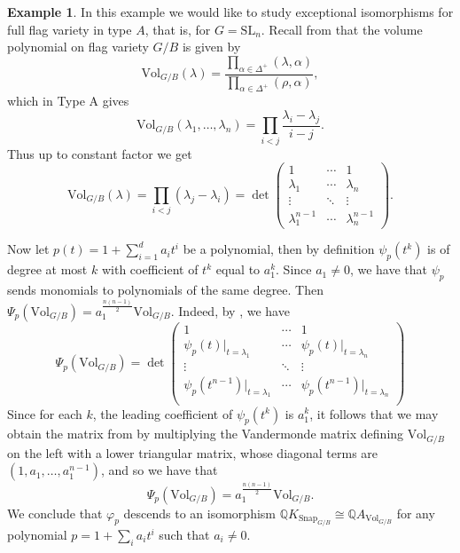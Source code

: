 \documentclass[oneside]{amsart}
\theoremstyle{plain}
\theoremstyle{definition}
\newtheorem{example}[theorem]{Example}
\newcommand{\Q}{{\mathbb{Q}}}
\newcommand{\SL}{{\mathrm{SL}}}
\newcommand{\Vol}{{\mathrm{Vol}}}
\newcommand{\Snap}{{\mathrm{Snap}}}
\begin{document}
\begin{example}\label{ex:exceptional-full-flag}
In this example we would like to study exceptional isomorphisms for full flag variety in type $A$, that is, for $G = \SL_n$. Recall from  that the volume polynomial on flag variety $G/B$ is given by
\[
 \Vol_{G/B}(\lambda) = \frac{\prod_{\alpha\in \Delta^+}(\lambda,\alpha)}{\prod_{\alpha\in \Delta^+}(\rho,\alpha)},
\]
which in Type A gives
\[
\Vol_{G/B}(\lambda_1,\ldots, \lambda_n) = \prod_{i<j}\frac{\lambda_i-\lambda_j}{i-j}.
\]
Thus up to constant factor we get 
\[
\Vol_{G/B}(\lambda) =    
    \prod_{i<j}(\lambda_j-\lambda_i)=\det \begin{pmatrix}
1  & \cdots & 1\\
\lambda_1 & \cdots & \lambda_n\\
\vdots & \ddots & \vdots\\
\lambda_1^{n-1} & \cdots & \lambda_n^{n-1}
\end{pmatrix}.
\]

Now let $p(t) = 1 + \sum_{i = 1}^d a_i t^i$ be a polynomial, then by definition
$\psi_p(t^k)$ is of degree at most $k$ with coefficient of $t^k$ equal to $a_1^k$.
Since $a_1 \neq 0$, we have that $\psi_p$ sends monomials to polynomials of the same degree.
Then $\Psi_p(\Vol_{G/B})= a_1^{\frac{n(n-1)}{2}}\Vol_{G/B}$. Indeed, by ,
we have
\begin{equation}
\label{eq:psi-vandermonde}
\Psi_p(\Vol_{G/B}) = \det
\begin{pmatrix}
    1 & \cdots & 1 \\
    \psi_p(t)|_{t = \lambda_1} & \cdots & \psi_p(t)|_{t = \lambda_n} \\
    \vdots & \ddots & \vdots \\
    \psi_p(t^{n - 1})|_{t = \lambda_1} & \cdots & \psi_p(t^{n - 1})|_{t = \lambda_n}\\
\end{pmatrix}
\end{equation}
Since for each $k$, the leading coefficient of $\psi_p(t^k)$ is $a_1^{k}$,
it follows that we may obtain the matrix 
from  by multiplying the Vandermonde matrix defining $\Vol_{G/B}$ on the left with a lower triangular matrix, whose diagonal terms are $(1, a_1, \dots, a_1^{n-1})$, and so we have that
\[\Psi_p(\Vol_{G/B}) = a_1^{\frac{n(n-1)}{2}} \Vol_{G/B}.\]
We conclude that $\varphi_p$ descends to an isomorphism
$\Q K_{\Snap_{G/B}} \cong \Q A_{\Vol_{G/B}}$ for any polynomial $p = 1 + \sum_{i} a_i t^i$ such that $a_i \neq 0$. 
\end{example}
\end{document}
